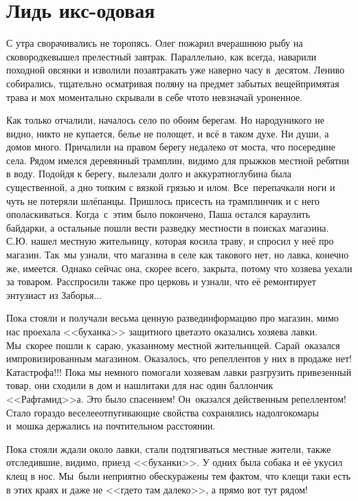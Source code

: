 \chapter{Лидь икс-одовая} 
\vepsianrose

С утра сворачивались не торопясь. Олег пожарил вчерашнюю рыбу на сковородке\mdash вышел прелестный завтрак. Параллельно, как всегда, наварили походной овсянки и изволили позавтракать уже наверно часу в~десятом. Лениво собирались, тщательно осматривая поляну на предмет забытых вещей\mdash примятая трава и мох моментально скрывали в себе что\sdash то невзначай уроненное.

Как только отчалили, началось село по обоим берегам. Но народу\mdash никого не видно, никто не купается, белье не полощет, и всё в таком духе. Ни души, а домов много. Причалили на правом берегу недалеко от моста, что посередине села. Рядом имелся деревянный трамплин, видимо для прыжков местной ребятни в воду. Подойдя к берегу, вылезали долго и аккуратно\mdash глубина была существенной, а дно топким с вязкой грязью и илом. Все~перепачкали ноги и чуть не потеряли шлёпанцы. Пришлось присесть на трамплинчик и с него ополаскиваться. Когда~с~этим было покончено, Паша остался караулить байдарки, а остальные пошли вести разведку местности в поисках магазина. С.Ю. нашел местную жительницу, которая косила траву, и спросил у неё про магазин. Так~мы узнали, что магазина в селе как такового нет, но лавка, конечно же, имеется. Однако сейчас она, скорее всего, закрыта, потому что хозяева уехали за товаром. Расспросили также про церковь и узнали, что её ремонтирует энтузиаст из Заборья$\ldots$
 
Пока стояли и получали весьма ценную развединформацию про магазин, мимо нас проехала <<буханка>> защитного цвета\mdash это оказались хозяева лавки. Мы~скорее пошли к~сараю, указанному местной жительницей. Сарай~оказался импровизированным магазином. Оказалось, что репеллентов у них в продаже нет! Катастрофа!!! Пока мы немного помогали хозяевам лавки разгрузить привезенный товар, они сходили в дом и нашли\sdash таки для нас один баллончик <<Рафтамид>>\sdash а. Это было спасением! Он~оказался действенным репеллентом! Стало гораздо веселее\mdash отпугивающие свойства сохранялись надолго\mdash комары и~мошка держались на почтительном расстоянии. 

Пока стояли ждали около лавки, стали подтягиваться местные жители, также отследившие, видимо, приезд <<буханки>>. У одних была собака и её укусил клещ в нос. Мы~были неприятно обескуражены тем фактом, что клещи таки есть в этих краях и даже не <<где\sdash то там далеко>>, а прямо вот тут рядом!

